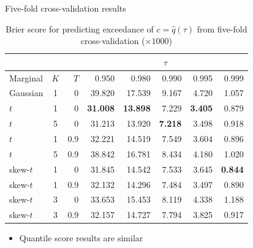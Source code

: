 \documentclass{beamer}
\begin{document}
\begin{frame}{Five-fold cross-validation results}
  \begin{table}[htbp]
    \small
    \centering
    \begin{tabular}{l|c|r|rrrrr}
          \multicolumn{3}{c}{\ } & \multicolumn{5}{c}{$\tau$}\\
           \hline
  Marginal & $K$ & $T$  & 0.950 & 0.980 & 0.990 & 0.995 & 0.999\\
  \hline
Gaussian 	& 1 & 0 	& 39.820 & 17.539 & 9.167 & 4.720 & 1.057\\
$t$		& 1 & 0 	& {\bf 31.008} & {\bf 13.898} & 7.229 & {\bf 3.405} & 0.879\\
$t$		& 5 & 0	& 31.213 & 13.920 & {\bf 7.218} & 3.498 & 0.918\\
$t$		& 1 & 0.9	& 32.221 & 14.519 & 7.549 & 3.604 & 0.896\\
$t$		& 5 & 0.9 	& 38.842 & 16.781 & 8.434 & 4.180 & 1.020\\
skew-$t$	& 1 & 0	& 31.845 & 14.542 & 7.533 & 3.645 & {\bf 0.844}\\
skew-$t$	& 1 & 0.9	& 32.132 & 14.296 & 7.484 & 3.497 & 0.890\\
skew-$t$	& 3 & 0	& 33.653 & 15.453 & 8.119 & 4.338 & 1.188\\
skew-$t$	& 3 & 0.9 	& 32.157 & 14.727 & 7.794 & 3.825 & 0.917\\
\hline
    \end{tabular}
    \caption{Brier score for predicting exceedance of $c = \hat{q}(\tau)$ from five-fold cross-validation ($\times 1000$)}
  \end{table} \vspace{-1.5em}
  \begin{itemize}
  	\item Quantile score results are similar
  \end{itemize}
\end{frame}


\end{document}
